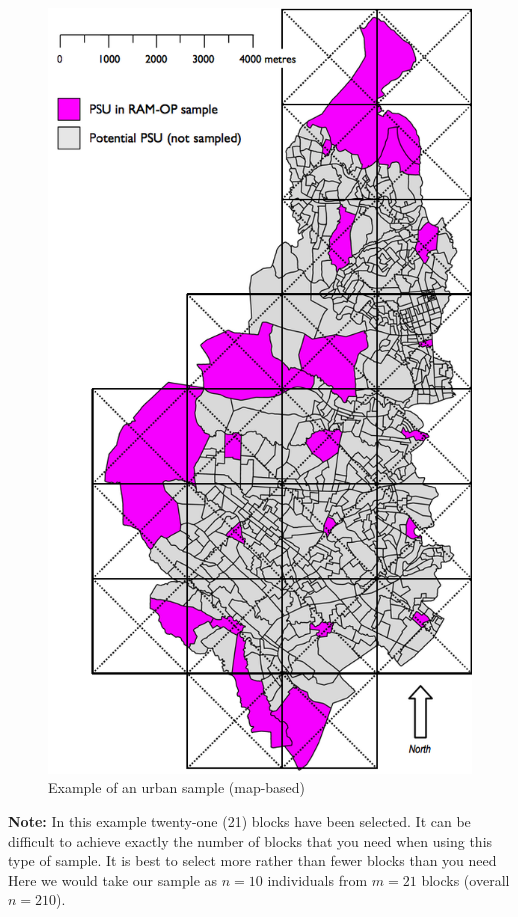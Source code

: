 \documentclass[12pt,]{book}
\theoremstyle{definition}
\theoremstyle{definition}
\theoremstyle{definition}
\theoremstyle{remark}
\begin{document}
\begin{figure}[h]

{\centering \includegraphics[width=8in]{figures/mapSample5} 

}

\caption{Example of an urban sample (map-based)}\label{fig:sample9}
\end{figure}

\textbf{Note:} In this example twenty-one (21) blocks have been
selected. It can be difficult to achieve exactly the number of blocks
that you need when using this type of sample. It is best to select more
rather than fewer blocks than you need Here we would take our sample as
\(n = 10\) individuals from \(m = 21\) blocks (overall \(n = 210\)).
\end{document}
